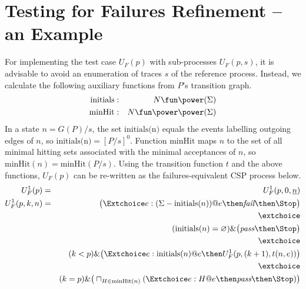 \section{Testing for Failures Refinement -- an Example}
\label{sec:case}


For implementing the test case $U_F(p)$ with sub-processes $U_F(p,s)$, it is
advisable to avoid an enumeration of traces $s$ of the reference process.
Instead, we calculate the following auxiliary functions from $P$'s transition
graph.
%
\begin{eqnarray*}
\text{initials} & : & N \fun \power (\Sigma)
\\
\text{minHit} & : & N \fun \power\power(\Sigma)
\end{eqnarray*}
%
In a state $n = G(P)/s$, the set $\text{initials(n)}$ equals the events
labelling outgoing edges of $n$, so  $\text{initials(n)} = [P/s]^0$. Function
$\text{minHit}$ maps $n$ to the set of all minimal hitting sets associated
with the minimal acceptances of $n$, so $\text{minHit}(n) =
\text{minHit}(P/s)$. Using the transition function $t$ and the above
functions, $U_F(p)$ can be re-written as the failures-equivalent CSP process
below.
%
\begin{eqnarray}
U_F^1(p) & = & U_F^1(p,0,\ii n)
\\
U_F^1(p,k,n) & = & \big(\Extchoice e:(\Sigma - \text{initials}(n)) @ e \then \efail\then \Stop \big)
\label{eq:xufa}
\\ & & \extchoice \nonumber
\\ & & (\text{initials}(n) = \varnothing)    \&   \big( \epass \then \Stop \big)
\label{eq:xufb}
\\ & & \extchoice \nonumber
\\ & & (k < p) \& \big(\Extchoice e:\text{initials}(n) @ e \then U_F^1(p,(k+1),t(n,e)) \big)
\label{eq:xufc}
\\ & & \extchoice \nonumber
\\ & & (k = p) \& \big( \sqcap_{H\in\text{minHit}(n)} (\Extchoice e:H @ e \then \epass \then\Stop ) \big)
\label{eq:xufd}
\end{eqnarray}

